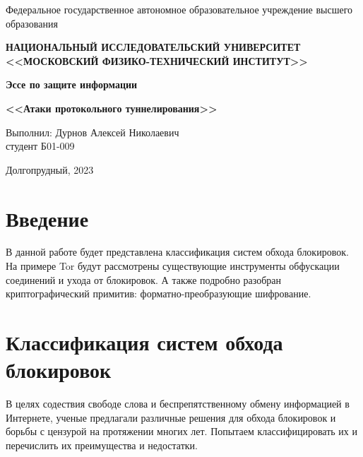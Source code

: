 
\newcommand{\boldm}[1]{{\boldsymbol{#1}}}

\usepackage{upgreek}


\begin{center}

    \normalsize{Федеральное государственное автономное образовательное учреждение высшего образования}

    \textbf{НАЦИОНАЛЬНЫЙ ИССЛЕДОВАТЕЛЬСКИЙ УНИВЕРСИТЕТ \\ <<МОСКОВСКИЙ ФИЗИКО-ТЕХНИЧЕСКИЙ ИНСТИТУТ>>}
    \vspace{13ex}

    \textbf{Эссе по защите информации}

    \textbf{<<Атаки протокольного туннелирования>>}
    \vspace{40ex}
\end{center}
\begin{flushright}
    \normalsize{Выполнил: Дурнов Алексей Николаевич \\ студент Б01-009 \\}
\end{flushright}

\vfill

\begin{center}
Долгопрудный, 2023
\end{center}

\thispagestyle{empty} %

\newpage

\section{Введение}

В данной работе будет представлена классификация систем обхода блокировок.
На примере Tor будут рассмотрены существующие инструменты обфускации соединений и ухода от блокировок.
А также подробно разобран криптографический примитив: форматно-преобразующие шифрование.

\section{Классификация систем обхода блокировок}
В целях содествия свободе слова и беспрепятственному обмену информацией в Интернете,
ученые предлагали различные решения для обхода блокировок и борьбы с цензурой на протяжении многих лет.
Попытаем классифицировать их и перечислить их преимущества и недостатки.

